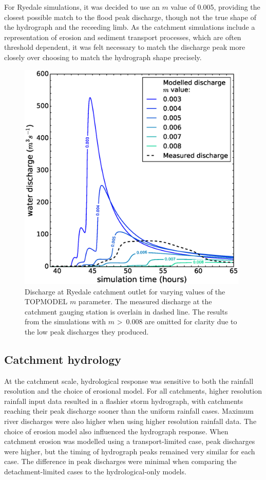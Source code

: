For Ryedale simulations, it was decided to use an \(m\) value of 0.005, providing the closest possible match to the flood peak discharge, though not the true shape of the hydrograph and the receeding limb. As the catchment simulations include a representation of erosion and sediment transport processes, which are often threshold dependent, it was felt necessary to match the discharge peak more closely over choosing to match the hydrograph shape precisely.

\begin{figure}[t]
\includegraphics[width=11cm]{chp06_figures_scripts/figure_ryedale_M_sens.eps}
\caption{Discharge at Ryedale catchment outlet for varying values of the TOPMODEL \(m\) parameter. The measured discharge at the catchment gauging station is overlain in dashed line. The results from the simulations with \(m\) \textgreater \ 0.008 are omitted for clarity due to the low peak discharges they produced.}
\label{fig_topmodel_m_ryedale}
\end{figure}

\subsection{Catchment hydrology}


At the catchment scale, hydrological response was sensitive to both the rainfall resolution and the choice of erosional model. For all catchments, higher resolution rainfall input data resulted in a flashier storm hydrograph, with catchments reaching their peak discharge sooner than the uniform rainfall cases. Maximum river discharges were also higher when using higher resolution rainfall data. The choice of erosion model also influenced the hydrograph response. When catchment erosion was modelled using a transport-limited case, peak discharges were higher, but the timing of hydrograph peaks remained very similar for each case. The difference in peak discharges were minimal when comparing the detachment-limited cases to the hydrological-only models.


